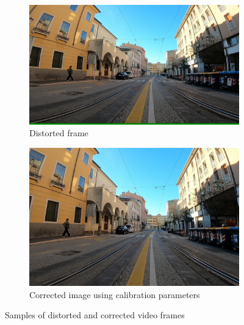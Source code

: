 \documentclass[11pt]{article}
\begin{document}
    \begin{figure}
        \centering
        \begin{subfigure}{0.45\textwidth}
            \centering
            \includegraphics[width=\linewidth]{images/experiment/img_distorted}
            \caption{Distorted frame}
        \end{subfigure}
        \hfill
        \begin{subfigure}{0.45\textwidth}
            \centering
            \includegraphics[width=\linewidth]{images/experiment/img_undistorted}
            \caption{Corrected image using calibration parameters}
        \end{subfigure}
        \caption{Samples of distorted and corrected video frames}
        \label{fig:img_distorted}
    \end{figure}
\end{document}
